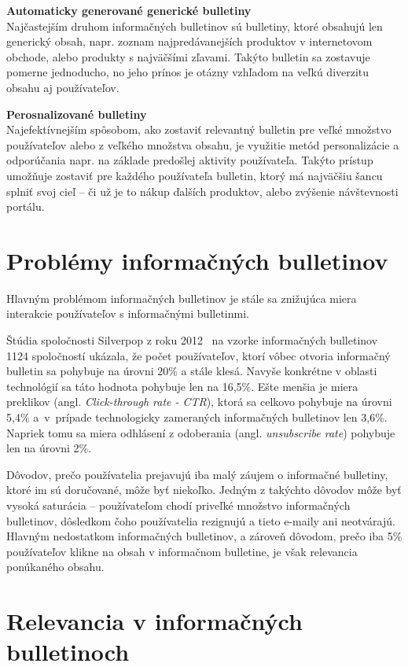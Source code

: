 \textbf{Automaticky generované generické bulletiny}\\
Najčastejším druhom informačných bulletinov sú bulletiny, ktoré obsahujú len generický obsah, napr. zoznam najpredávanejších
produktov v internetovom obchode, alebo produkty s najväčšími zľavami. Takýto bulletin sa zostavuje pomerne jednoducho,
no jeho prínos je otázny vzhľadom na veľkú diverzitu obsahu aj používateľov.

\textbf{Perosnalizované bulletiny}\\
Najefektívnejším spôsobom, ako zostaviť relevantný bulletin pre veľké množstvo používateľov alebo z veľkého množstva obsahu,
je využitie metód personalizácie a odporúčania napr. na základe predošlej aktivity používateľa. Takýto prístup umožňuje
zostaviť pre každého používateľa bulletin, ktorý má najväčšiu šancu splniť svoj cieľ -- či už je to nákup ďalších produktov,
alebo zvýšenie návštevnosti portálu.


\section{Problémy informačných bulletinov}
Hlavným problémom informačných bulletinov je stále sa znižujúca miera interakcie používateľov
s informačnými bulletinmi.

Štúdia spoločnosti Silverpop z roku 2012~\cite{mailmarketing} na vzorke informačných bulletinov 1124 spoločností ukázala,
že počet používateľov, ktorí vôbec otvoria informačný bulletin sa pohybuje na úrovni 20\% a stále klesá. Navyše konkrétne
v oblasti technológií sa táto hodnota pohybuje len na 16,5\%. Ešte menšia je miera preklikov
(angl. \emph{Click-through rate - CTR}), ktorá sa celkovo pohybuje na úrovni 5,4\% a~v~prípade technologicky zameraných
informačných bulletinov len 3,6\%. Napriek tomu sa miera odhlásení z odoberania (angl. \emph{unsubscribe rate}) pohybuje
len na úrovni 2\%.

Dôvodov, prečo používatelia prejavujú iba malý záujem o informačné bulletiny, ktoré im sú doručované, môže byť niekoľko.
Jedným z takýchto dôvodov môže byť vysoká saturácia -- používateľom chodí priveľké množstvo informačných bulletinov,
dôsledkom čoho používatelia rezignujú a tieto e-maily ani neotvárajú.
Hlavným nedostatkom informačných bulletinov, a zároveň dôvodom, prečo iba 5\% používateľov klikne na obsah v informačnom
bulletine, je však relevancia ponúkaného obsahu.


\section{Relevancia v informačných bulletinoch}

